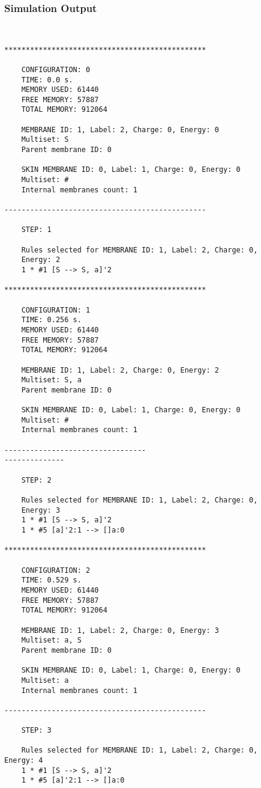 \documentclass{acm_proc_article-sp}
\begin{document}
\subsubsection{Simulation Output}
\begin{lstlisting}


***********************************************

    CONFIGURATION: 0
    TIME: 0.0 s.
    MEMORY USED: 61440
    FREE MEMORY: 57887
    TOTAL MEMORY: 912064

    MEMBRANE ID: 1, Label: 2, Charge: 0, Energy: 0
    Multiset: S
    Parent membrane ID: 0

    SKIN MEMBRANE ID: 0, Label: 1, Charge: 0, Energy: 0
    Multiset: #
    Internal membranes count: 1

-----------------------------------------------

    STEP: 1

    Rules selected for MEMBRANE ID: 1, Label: 2, Charge: 0, 
    Energy: 2
    1 * #1 [S --> S, a]'2

***********************************************

    CONFIGURATION: 1
    TIME: 0.256 s.
    MEMORY USED: 61440
    FREE MEMORY: 57887
    TOTAL MEMORY: 912064

    MEMBRANE ID: 1, Label: 2, Charge: 0, Energy: 2
    Multiset: S, a
    Parent membrane ID: 0

    SKIN MEMBRANE ID: 0, Label: 1, Charge: 0, Energy: 0
    Multiset: #
    Internal membranes count: 1

---------------------------------
--------------

    STEP: 2

    Rules selected for MEMBRANE ID: 1, Label: 2, Charge: 0, 
    Energy: 3
    1 * #1 [S --> S, a]'2
    1 * #5 [a]'2:1 --> []a:0

***********************************************

    CONFIGURATION: 2
    TIME: 0.529 s.
    MEMORY USED: 61440
    FREE MEMORY: 57887
    TOTAL MEMORY: 912064

    MEMBRANE ID: 1, Label: 2, Charge: 0, Energy: 3
    Multiset: a, S
    Parent membrane ID: 0

    SKIN MEMBRANE ID: 0, Label: 1, Charge: 0, Energy: 0
    Multiset: a
    Internal membranes count: 1

-----------------------------------------------

    STEP: 3

    Rules selected for MEMBRANE ID: 1, Label: 2, Charge: 0, 	Energy: 4
    1 * #1 [S --> S, a]'2
    1 * #5 [a]'2:1 --> []a:0


\end{lstlisting}
\end{document}
